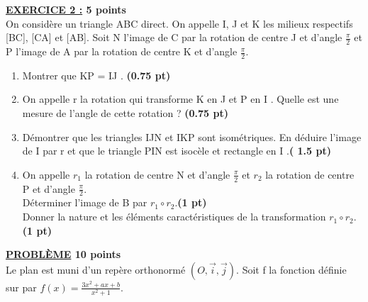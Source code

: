 \documentclass[a4paper,12pt]{book}
\begin{document}
\textbf{\underline{EXERCICE 2 :} 5 points }\\
On considère un triangle ABC direct. On appelle I, J et K les milieux respectifs [BC], [CA] et [AB]. Soit N l'image de C par la rotation de centre J et d'angle $\displaystyle{\frac{\pi}{2}}$ et P l'image de A par la rotation de centre K et d'angle $\displaystyle{\frac{\pi}{2}}$.
\begin{enumerate}
	\item Montrer que KP = IJ .\textbf{ (0.75 pt)}
	\item On appelle r la rotation qui transforme K en J et P en I . Quelle est une mesure de l’angle de cette rotation ?\textbf{ (0.75 pt)}
	\item Démontrer que les triangles IJN et IKP sont isométriques. En déduire l’image de I par r et que le triangle PIN est isocèle et rectangle en I .\textbf{( 1.5 pt)}
	\item On appelle $r_1$ la rotation de centre N et d’angle $\displaystyle{\frac{\pi}{2}}$ 	et $r_2$ la rotation de centre P et d’angle $\displaystyle{\frac{\pi}{2}}$.\\
	Déterminer l'image de B par $r_1\circ r_2$.\textbf{(1 pt)} \\
	Donner la nature et les éléments caractéristiques de la transformation  $r_1\circ r_2$.\textbf{(1 pt)}
\end{enumerate}
\textbf{\underline{PROBLÈME} 10 points}\\
Le plan est muni d'un  repère orthonormé $(O,\overrightarrow{i},\overrightarrow{j})$. Soit f la fonction définie sur par $\displaystyle{f(x)=\frac{3x^2+ax+b}{x^2+1}}$.
\end{document}

